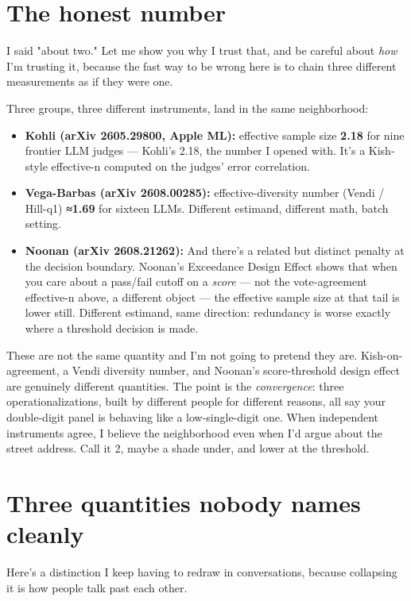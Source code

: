 \documentclass[11pt]{article}
\begin{document}
\section*{The honest number}

I said "about two." Let me show you why I trust that, and be careful about \emph{how} I'm trusting it, because the fast way to be wrong here is to chain three different measurements as if they were one.

Three groups, three different instruments, land in the same neighborhood:

\begin{itemize}
\item \textbf{Kohli (arXiv 2605.29800, Apple ML):} effective sample size \textbf{2.18} for nine frontier LLM judges — Kohli's 2.18, the number I opened with. It's a Kish-style effective-n computed on the judges' error correlation.
\item \textbf{Vega-Barbas (arXiv 2608.00285):} effective-diversity number (Vendi / Hill-q1) \textbf{≈1.69} for sixteen LLMs. Different estimand, different math, batch setting.
\item \textbf{Noonan (arXiv 2608.21262):} And there's a related but distinct penalty at the decision boundary. Noonan's Exceedance Design Effect shows that when you care about a pass/fail cutoff on a \emph{score} — not the vote-agreement effective-n above, a different object — the effective sample size at that tail is lower still. Different estimand, same direction: redundancy is worse exactly where a threshold decision is made.
\end{itemize}

These are not the same quantity and I'm not going to pretend they are. Kish-on-agreement, a Vendi diversity number, and Noonan's score-threshold design effect are genuinely different quantities. The point is the \emph{convergence}: three operationalizations, built by different people for different reasons, all say your double-digit panel is behaving like a low-single-digit one. When independent instruments agree, I believe the neighborhood even when I'd argue about the street address. Call it 2, maybe a shade under, and lower at the threshold.

\section*{Three quantities nobody names cleanly}

Here's a distinction I keep having to redraw in conversations, because collapsing it is how people talk past each other.
\end{document}
